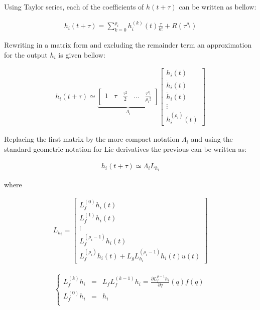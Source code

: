 \documentclass[letterpaper, 10 pt, conference]{ieeeconf}  %
\begin{document}
Using Taylor series, each of the coefficients of $h(t+\tau)$ can be written as bellow:

\begin{align*}
h_i(t+\tau) = \sum_{k=0}^{\rho_i} 
h^{(k)}_i(t)\frac{\tau}{k!} + R(\tau^{\rho_i})
\end{align*}

Rewriting in a matrix form and excluding the remainder term an approximation for the output $h_i$ is given bellow:

\begin{eqnarray}
h_i(t+\tau) \simeq \underbrace{\left[\begin{array}{ccccc}
1 & \tau & \frac{\tau^2}{2} & \dots & \frac{\tau^{\rho_i}}{{\rho_i}!}
\end{array}\right]}_{\Lambda_i}
\left[\begin{array}{c}
h_i(t)\\
\dot{h}_i(t)\\
\ddot{h}_i(t)\\
\vdots\\
h^{(\rho_i)}_i(t)
\end{array}\right]
\end{eqnarray}

Replacing the first matrix by the more compact notation $\Lambda_i$ and using the standard geometric notation for Lie derivatives the previous can be written as:

\begin{eqnarray}
h_i(t+\tau) \simeq \Lambda_i L_{h_i}
\end{eqnarray}

where

\begin{eqnarray*}
L_{h_i} = \left[\begin{array}{c}
L_f^{(0)}h_i(t)\\
L_f^{(1)}h_i(t)\\
\vdots\\
L^{({\rho_i}-1)}_fh_i(t)\\
L^{({\rho_i})}_fh_i(t)+L_gL_{h_i}^{({\rho_i}-1)}h_i(t)u(t)
\end{array}\right]
\end{eqnarray*}


\begin{eqnarray*}
\left\lbrace\begin{array}{lcl}
L_f^{(k)} h_i & = & L_fL_f^{(k-1)}h_i = \frac{\partial L_f^{\rho-1}h_i}{\partial q}(q)f(q)\\
L_f^{(0)}h_i & = & h_i\\
\end{array}\right.
\end{eqnarray*}
\end{document}
